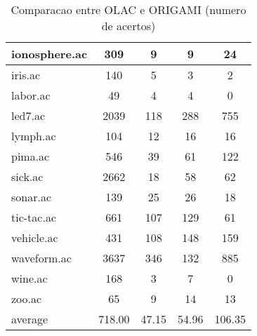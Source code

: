 \begin{table}[htbp]
\begin{tabular}{|l|c|c|c|c|}
		\hline
		ionosphere.ac   & 309           & 9                  & 9                        & 24                            \\
		\hline
		iris.ac         & 140           & 5                  & 3                        & 2                             \\
		\hline
		labor.ac        & 49            & 4                  & 4                        & 0                             \\
		\hline
		led7.ac         & 2039          & 118                & 288                      & 755                           \\
		\hline
		lymph.ac        & 104           & 12                 & 16                       & 16                            \\
		\hline
		pima.ac         & 546           & 39                 & 61                       & 122                           \\
		\hline
		sick.ac         & 2662          & 18                 & 58                       & 62                            \\
		\hline
		sonar.ac        & 139           & 25                 & 26                       & 18                            \\
		\hline
		tic-tac.ac      & 661           & 107                & 129                      & 61                            \\
		\hline
		vehicle.ac      & 431           & 108                & 148                      & 159                           \\
		\hline
		waveform.ac     & 3637          & 346                & 132                      & 885                           \\
		\hline
		wine.ac         & 168           & 3                  & 7                        & 0                             \\
		\hline
		zoo.ac          & 65            & 9                  & 14                       & 13                            \\
		\hline
		average         & 718.00        & 47.15              & 54.96                    & 106.35                        \\
		\hline
		\end{tabular}
	\caption{Comparacao entre OLAC e ORIGAMI (numero de acertos)}
	\label{tab:comparison_olac_origami_uc}
\end{table}